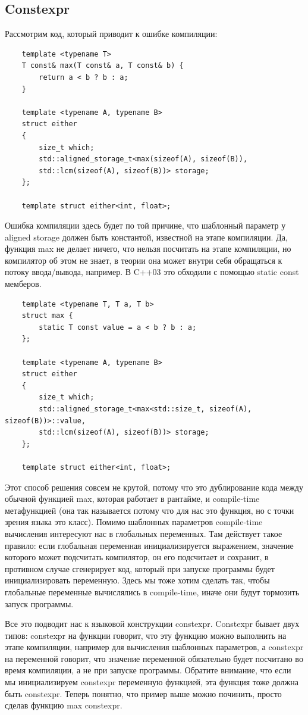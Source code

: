 \documentclass[12pt, a4paper]{article}
\begin{document}
\subsection{Constexpr}
\par Рассмотрим код, который приводит к ошибке компиляции:
\begin{verbatim}
	template <typename T>
	T const& max(T const& a, T const& b) {
		return a < b ? b : a;
	}
	
	template <typename A, typename B>
	struct either
	{
		size_t which;
		std::aligned_storage_t<max(sizeof(A), sizeof(B)),
		std::lcm(sizeof(A), sizeof(B))> storage;
	};
	
	template struct either<int, float>;
\end{verbatim}
Ошибка компиляции здесь будет по той причине, что шаблонный параметр у aligned storage должен быть константой, известной на этапе компиляции. Да, функция max не делает ничего, что нельзя посчитать на этапе компиляции, но компилятор об этом не знает, в теории она может внутри себя обращаться к потоку ввода/вывода, например. В C++03 это обходили с помощью static const мемберов.
\begin{verbatim}
	template <typename T, T a, T b>
	struct max {
		static T const value = a < b ? b : a;
	};
	
	template <typename A, typename B>
	struct either
	{
		size_t which;
		std::aligned_storage_t<max<std::size_t, sizeof(A), sizeof(B))>::value,
		std::lcm(sizeof(A), sizeof(B))> storage;
	};
	
	template struct either<int, float>;
\end{verbatim}
Этот способ решения совсем не крутой, потому что это дублирование кода между обычной функцией max, которая работает в рантайме, и compile-time метафункцией (она так называется потому что для нас это функция, но с точки зрения языка это класс). Помимо шаблонных параметров compile-time вычисления интересуют нас в глобальных переменных. Там действует такое правило: если глобальная переменная инициализируется выражением, значение которого может подсчитать компилятор, он его подсчитает и сохранит, в противном случае сгенерирует код, который при запуске программы будет инициализировать переменную. Здесь мы тоже хотим сделать так, чтобы глобальные переменные вычислялись в compile-time, иначе они будут тормозить запуск программы.
\par Все это подводит нас к языковой конструкции constexpr. Constexpr бывает двух типов: constexpr на функции говорит, что эту функцию можно выполнить на этапе компиляции, например для вычисления шаблонных параметров, а constexpr на переменной говорит, что значение переменной обязательно будет посчитано во время компиляции, а не при запуске программы. Обратите внимание, что если мы инициализируем constexpr переменную функцией, эта функция тоже должна быть constexpr. Теперь понятно, что пример выше можно починить, просто сделав функцию max constexpr.
\end{document}

